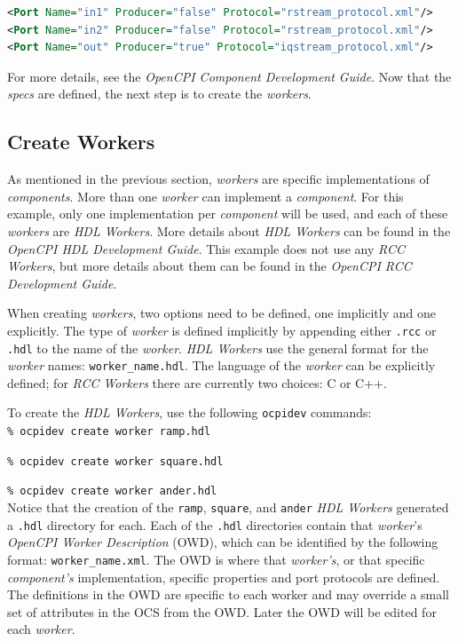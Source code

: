 \begin{lstlisting}[language=xml]
<Port Name="in1" Producer="false" Protocol="rstream_protocol.xml"/>
<Port Name="in2" Producer="false" Protocol="rstream_protocol.xml"/>
<Port Name="out" Producer="true" Protocol="iqstream_protocol.xml"/>
\end{lstlisting}
\bend
For more details, see the \textit{OpenCPI Component Development Guide}. Now that the \textit{specs} are defined, the next step is to create the \textit{workers}.

\subsection{Create Workers}
As mentioned in the previous section, \textit{workers} are specific implementations of \textit{components}. More than one \textit{worker} can implement a \textit{component}. For this example, only one implementation per \textit{component} will be used, and each of these \textit{workers} are \textit{HDL Workers}. More details about \textit{HDL Workers} can be found in the \textit{OpenCPI HDL Development Guide}. This example does not use any \textit{RCC Workers}, but more details about them can be found in the \textit{OpenCPI RCC Development Guide}.\newline

When creating \textit{workers}, two options need to be defined, one implicitly and one explicitly. The type of \textit{worker} is defined implicitly by appending either \verb+.rcc+ or \verb+.hdl+ to the name of the \textit{worker}. \textit{HDL Workers} use the general format for the \textit{worker} names: \verb+worker_name.hdl+. The language of the \textit{worker} can be explicitly defined; for \textit{RCC Workers} there are currently two choices: C or C++.\newline

To create the \textit{HDL Workers}, use the following \verb+ocpidev+ commands:\\

\forceindent\verb+% ocpidev create worker ramp.hdl+

\forceindent\verb+% ocpidev create worker square.hdl+

\forceindent\verb+% ocpidev create worker ander.hdl+\\

Notice that the creation of the \verb+ramp+, \verb+square+, and \verb+ander+ \textit{HDL Workers} generated a \verb+.hdl+ directory for each. Each of the \verb+.hdl+ directories contain that \textit{worker}'s \textit{OpenCPI Worker Description} (OWD), which can be identified by the following format: \verb+worker_name.xml+. The OWD is where that \textit{worker's}, or that specific \textit{component's} implementation, specific properties and port protocols are defined. The definitions in the OWD are specific to each worker and may override a small set of attributes in the OCS from the OWD. Later the OWD will be edited for each \textit{worker}.\newline

